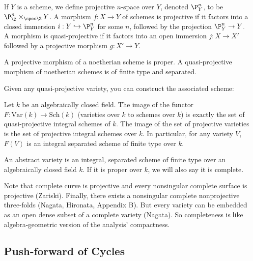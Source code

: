\begin{dfn}
If $Y$ is a scheme, we define projective $n$-space over $Y$, denoted $\P^n_Y$, to be $\P^n_\Z \times_{\spec \Z} Y$. A morphism $f: X \to Y$ of schemes is projective if it factors into a closed immersion $i: Y \hookrightarrow \P_Y^n$ for some $n$, followed by the projection $\P_Y^n \to Y$. A morphism is quasi-projective if it factors into an open immersion $j: X \to X'$ followed by a projective morphism $g: X' \to Y$. 
\end{dfn}


\begin{thmm}
A projective morphism of a noetherian scheme is proper. A quasi-projective morphism of noetherian schemes is of finite type and separated. 
\end{thmm}


Given any quasi-projective variety, you can construct the associated scheme:


\begin{prop}
Let $k$ be an algebraically closed field. The image of the functor $F: \text{Var}(k) \to \text{Sch}(k)$ (varieties over $k$ to schemes over $k$) is exactly the set of quasi-projective integral schemes of $k$. The image of the set of projective varieties is the set of projective integral schemes over $k$. In particular, for any variety $V$, $F(V)$ is an integral separated scheme of finite type over $k$. 
\end{prop}


\begin{dfn}
An abstract variety is an integral, separated scheme of finite type over an algebraically closed field $k$. If it is proper over $k$, we will also say it is complete. 
\end{dfn}


Note that complete curve is projective and every nonsingular complete surface is projective (Zariski). Finally, there exists a nonsingular complete nonprojective three-folds (Nagata, Hironata, Appendix B). But every variety can be embedded as an open dense subset of a complete variety (Nagata). So completeness is like algebra-geometric version of the analysis' compactness. 


\subsection{Push-forward of Cycles}

